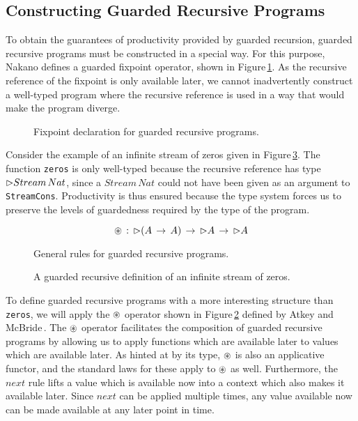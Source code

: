 \subsection{Constructing Guarded Recursive Programs}
\label{sec:constr-guard-recurs}
To obtain the guarantees of productivity provided by guarded recursion, guarded recursive programs must be constructed in a special way. For this purpose, Nakano defines a guarded fixpoint operator, shown in Figure\,\ref{fig:guarded_recursion_fixpoint}. As the recursive reference of the fixpoint is only available later, we cannot inadvertently construct a well-typed program where the recursive reference is used in a way that would make the program diverge.
\begin{figure}

\caption{Fixpoint declaration for guarded recursive programs.}
\label{fig:guarded_recursion_fixpoint}
\end{figure} 
Consider the example of an infinite stream of zeros given in Figure\,\ref{fig:guarded_recursion_zeros}. The function \texttt{zeros} is only well-typed because the recursive reference has type $\rhd Stream\,Nat$, since a $Stream\,Nat$ could not have been given as an argument to \texttt{StreamCons}. Productivity is thus ensured because the type system forces us to preserve the levels of guardedness required by the type of the program.
\begin{figure}
\[
\circledast \, :\, \rhd (A\, \rightarrow \, A)\, \rightarrow \, \rhd A\, \rightarrow \, \rhd A
\]

\caption{General rules for guarded recursive programs.}
\label{fig:guarded_recursion_rules}
\end{figure}

\begin{figure}

\caption{A guarded recursive definition of an infinite stream of zeros.}
\label{fig:guarded_recursion_zeros}
\end{figure} 
To define guarded recursive programs with a more interesting structure than \texttt{zeros}, we will apply the $\circledast$ operator shown in Figure\,\ref{fig:guarded_recursion_rules} defined by Atkey and McBride\,\citep{Atkey:2013}. The $\circledast$ operator facilitates the composition of guarded recursive programs by allowing us to apply functions which are available later to values which are available later. As hinted at by its type, $\circledast$ is also an applicative functor, and the standard laws for these apply to $\circledast$ as well. Furthermore, the $next$ rule lifts a value which is available now into a context which also makes it available later. Since $next$ can be applied multiple times, any value available now can be made available at any later point in time.

